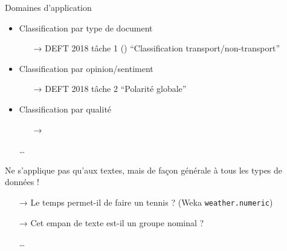 \documentclass[xcolor={svgnames}, french]{beamer}
\begin{document}
\begin{frame}{Domaines d'application}
	\begin{itemize}
		\item Classification par type de document
			\begin{itemize}
				\item[→] DEFT 2018 tâche 1 () \enquote{Classification transport/non-transport}
			\end{itemize}
		\item Classification par opinion/sentiment
			\begin{itemize}
				\item[→] DEFT 2018 tâche 2 \enquote{Polarité globale}
			\end{itemize}
		\item Classification par qualité
			\begin{itemize}
				\item[→] 
			\end{itemize}
		\item[…]
	\end{itemize}
	Ne s'applique pas qu'aux textes, mais de façon générale à tous les types de données !
	\begin{itemize}
		\item[→] Le temps permet-il de faire un tennis ? (Weka \texttt{weather.numeric})
		\item[→] Cet empan de texte est-il un groupe nominal ?
		\item[…]
	\end{itemize}
\end{frame}
\end{document}
